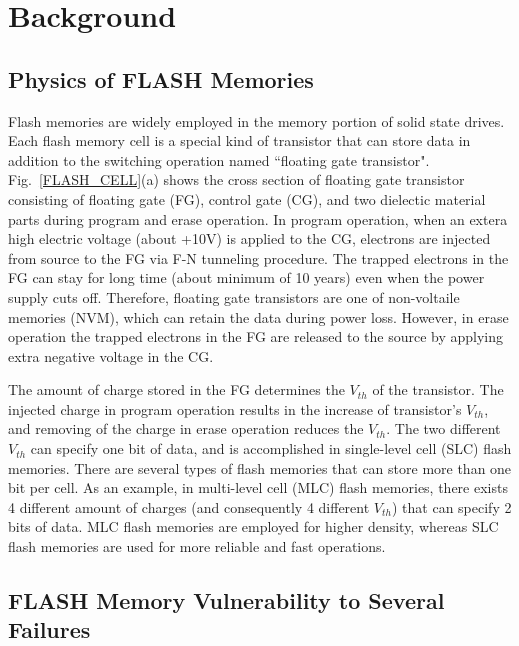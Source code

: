 \section{Background}
\label{SEC:BAK}
\subsection{Physics of FLASH Memories}
\label{sec:phisics}


Flash memories are widely employed in the memory portion of solid state drives. Each flash memory cell is a special kind of transistor that can store data in addition to the switching operation named ``floating gate transistor". Fig.~\ref{FLASH_CELL}(a) shows the cross section of floating gate transistor consisting of floating gate (FG), control gate (CG), and two dielectic material parts during program and erase operation. In program operation, when an extera high electric voltage (about +10V) is applied to the CG, electrons are injected from source to the FG via F-N tunneling procedure. The trapped electrons in the FG can stay for long time (about minimum of 10 years) even when the power supply cuts off. Therefore, floating gate transistors are one of non-voltaile memories (NVM),  which can retain the data during power loss. However, in erase operation the trapped electrons in the FG are released to the source by applying extra negative voltage in the CG. 

The amount of charge stored in the FG determines the $V_{th}$ of the transistor. The injected charge in program operation results in the increase of transistor's $V_{th}$, and removing of the charge in erase operation reduces the $V_{th}$. The two different $V_{th}$ can specify one bit of data, and is accomplished in single-level cell (SLC) flash memories. There are several types of flash memories that can store more than one bit per cell. As an example, in multi-level cell (MLC) flash memories, there exists 4 different amount of charges (and consequently 4 different $V_{th}$) that can specify 2 bits of data. MLC flash memories are employed for higher density, whereas SLC flash memories are used for more reliable and fast operations.

\subsection{FLASH Memory Vulnerability to Several Failures}
\label{sec:Vulnerabilities}

